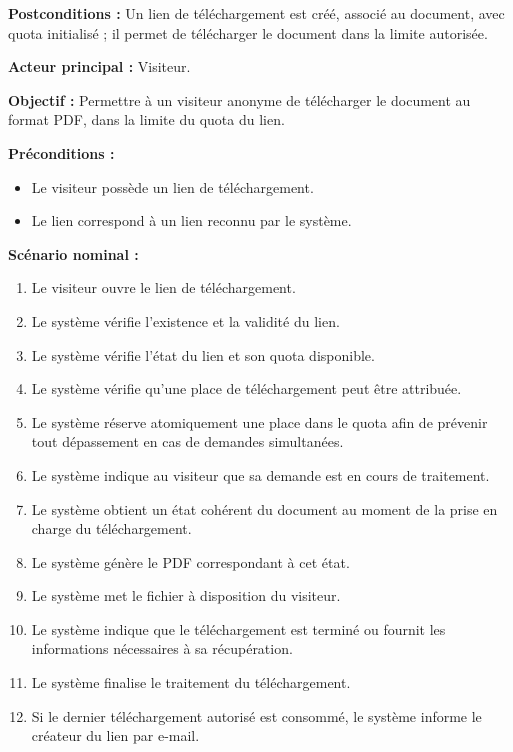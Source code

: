 \begin{description}[leftmargin=0pt, style=nextline, font=\normalfont\bfseries\color{violetprincipal}]
    \textbf{Postconditions :} Un lien de téléchargement est créé, associé au document, avec quota initialisé ; il permet de télécharger le document dans la limite autorisée.

    \item[UC08 --- Télécharger un journal]

    \textbf{Acteur principal :} Visiteur.

    \textbf{Objectif :} Permettre à un visiteur anonyme de télécharger le document au format PDF, dans la limite du quota du lien.

    \textbf{Préconditions :}
    \begin{itemize}
        \item Le visiteur possède un lien de téléchargement.
        \item Le lien correspond à un lien reconnu par le système.
    \end{itemize}

    \textbf{Scénario nominal :}
    \begin{enumerate}
        \item Le visiteur ouvre le lien de téléchargement.
        \item Le système vérifie l'existence et la validité du lien.
        \item Le système vérifie l'état du lien et son quota disponible.
        \item Le système vérifie qu'une place de téléchargement peut être attribuée.
        \item Le système réserve atomiquement une place dans le quota afin de prévenir tout dépassement en cas de demandes simultanées.
        \item Le système indique au visiteur que sa demande est en cours de traitement.
        \item Le système obtient un état cohérent du document au moment de la prise en charge du téléchargement.
        \item Le système génère le PDF correspondant à cet état.
        \item Le système met le fichier à disposition du visiteur.
        \item Le système indique que le téléchargement est terminé ou fournit les informations nécessaires à sa récupération.
        \item Le système finalise le traitement du téléchargement.
        \item Si le dernier téléchargement autorisé est consommé, le système informe le créateur du lien par e-mail.
    \end{enumerate}


\end{description}
